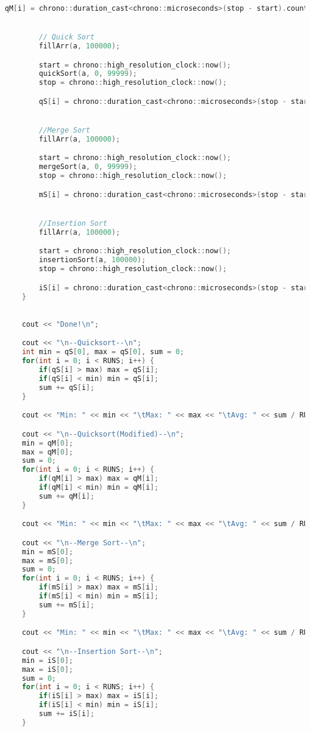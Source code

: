 \documentclass[letterpaper, 11pt]{article}
\begin{document}
\begin{lstlisting}[language=c++, caption=main.cpp]
        qM[i] = chrono::duration_cast<chrono::microseconds>(stop - start).count();


        // Quick Sort
        fillArr(a, 100000);

        start = chrono::high_resolution_clock::now();
        quickSort(a, 0, 99999);
        stop = chrono::high_resolution_clock::now();

        qS[i] = chrono::duration_cast<chrono::microseconds>(stop - start).count();


        //Merge Sort
        fillArr(a, 100000);

        start = chrono::high_resolution_clock::now();
        mergeSort(a, 0, 99999);
        stop = chrono::high_resolution_clock::now();

        mS[i] = chrono::duration_cast<chrono::microseconds>(stop - start).count();


        //Insertion Sort
        fillArr(a, 100000);

        start = chrono::high_resolution_clock::now();
        insertionSort(a, 100000);
        stop = chrono::high_resolution_clock::now();

        iS[i] = chrono::duration_cast<chrono::microseconds>(stop - start).count();
    }
    

    cout << "Done!\n";

    cout << "\n--Quicksort--\n";
    int min = qS[0], max = qS[0], sum = 0;
    for(int i = 0; i < RUNS; i++) {
        if(qS[i] > max) max = qS[i];
        if(qS[i] < min) min = qS[i];
        sum += qS[i];
    }

    cout << "Min: " << min << "\tMax: " << max << "\tAvg: " << sum / RUNS << '\n';

    cout << "\n--Quicksort(Modified)--\n";
    min = qM[0];
    max = qM[0];
    sum = 0;
    for(int i = 0; i < RUNS; i++) {
        if(qM[i] > max) max = qM[i];
        if(qM[i] < min) min = qM[i];
        sum += qM[i];
    }

    cout << "Min: " << min << "\tMax: " << max << "\tAvg: " << sum / RUNS << '\n';

    cout << "\n--Merge Sort--\n";
    min = mS[0];
    max = mS[0];
    sum = 0;
    for(int i = 0; i < RUNS; i++) {
        if(mS[i] > max) max = mS[i];
        if(mS[i] < min) min = mS[i];
        sum += mS[i];
    }

    cout << "Min: " << min << "\tMax: " << max << "\tAvg: " << sum / RUNS << '\n';

    cout << "\n--Insertion Sort--\n";
    min = iS[0];
    max = iS[0];
    sum = 0;
    for(int i = 0; i < RUNS; i++) {
        if(iS[i] > max) max = iS[i];
        if(iS[i] < min) min = iS[i];
        sum += iS[i];
    }


\end{lstlisting}
\end{document}
